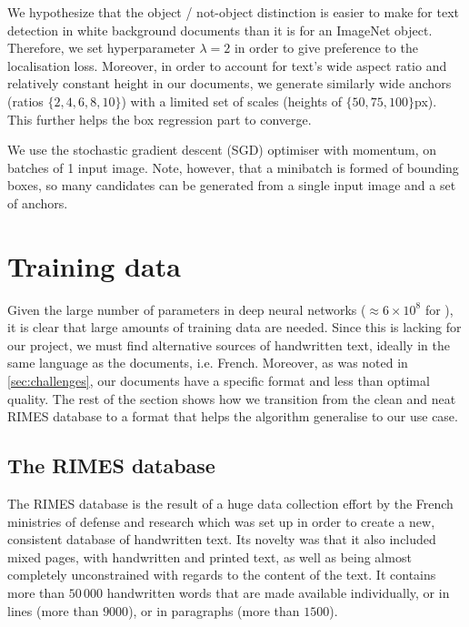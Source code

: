		We hypothesize that the object / not-object distinction is easier to make for text detection in white background documents than it is for an ImageNet object. Therefore, we set hyperparameter \(\lambda = 2\) in order to give preference to the localisation loss. Moreover, in order to account for text's wide aspect ratio and relatively constant height in our documents, we generate similarly wide anchors (ratios \(\{2, 4, 6, 8, 10\}\)) with a limited set of scales (heights of \(\{50, 75, 100\}\)px). This further helps the box regression part to converge.

		We use the stochastic gradient descent (SGD) optimiser with momentum, on batches of 1 input image. Note, however, that a minibatch is formed of bounding boxes, so many candidates can be generated from a single input image and a set of anchors.




\section{Training data}\label{sec:detection_data}
	Given the large number of parameters in deep neural networks (\(\approx 6 \times 10^8\) for \RESNET{}), it is clear that large amounts of training data are needed. Since this is lacking for our project, we must find alternative sources of handwritten text, ideally in the same language as the documents, i.e. French. Moreover, as was noted in \autoref{sec:challenges}, our documents have a specific format and less than optimal quality. The rest of the section shows how we transition from the clean and neat RIMES database \citep{rimes} to a format that helps the algorithm generalise to our use case.


	\subsection{The RIMES database}\label{sec:rimes}
		The RIMES database is the result of a huge data collection effort by the French ministries of defense and research which was set up in order to create a new, consistent database of handwritten text. Its novelty was that it also included mixed pages, with handwritten and printed text, as well as being almost completely unconstrained with regards to the content of the text.	It contains more than \(50\,000\) handwritten words that are made available individually, or in lines (more than \(9000\)), or in paragraphs (more than \(1500\)).

